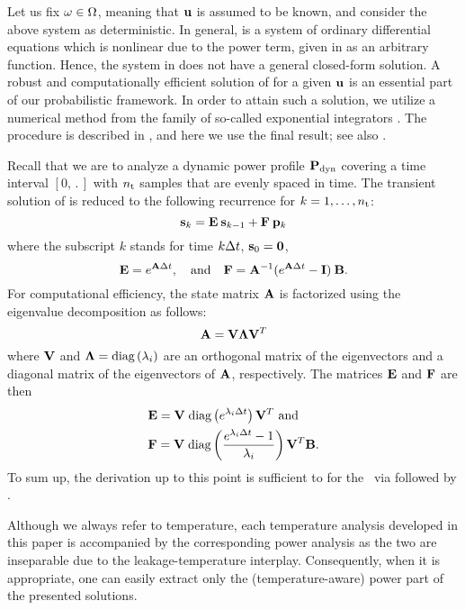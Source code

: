 Let us fix $\omega \in \Omega$, meaning that $\mathbf{u}$ is assumed to be known, and consider the above system as deterministic.
In general,  is a system of ordinary differential equations which is nonlinear due to the power term, given in  as an arbitrary function.
Hence, the system in  does not have a general closed-form solution.
A robust and computationally efficient solution of  for a given $\mathbf{u}$ is an essential part of our probabilistic framework.
In order to attain such a solution, we utilize a numerical method from the family of so-called exponential integrators \cite{hochbruck2010}.
The procedure is described in , and here we use the final result; see also \cite{ukhov2012}.

Recall that we are to analyze a dynamic power profile $\mathbf{P}_{\text{dyn}}$ covering a time interval $[0, \period]$ with ${n_\text{t}}$ samples that are evenly spaced in time.
The transient solution of  is reduced to the following recurrence for $k = 1, \dots, {n_\text{t}}$:
\begin{equation} \elab{recurrence}
  \vs_k = \mE \: \vs_{k - 1} + \mF \: \vp_k
\end{equation}
where the subscript $k$ stands for time $k \Delta t$, $\mathbf{s}_0 = \mathbf{0}$,
\[
  \mathbf{E} = e^{\mathbf{A} \Delta t}, \hspace{1em} \text{and} \hspace{1em} \mathbf{F} = \mathbf{A}^{-1} (e^{\mathbf{A} \Delta t} - \mathbf{I}) \: \mathbf{B}.
\]
For computational efficiency, the state matrix $\mathbf{A}$ is factorized using the eigenvalue decomposition as follows:
\begin{equation} \elab{eigenvalue-decomposition}
  \mA = \mV \mL \mV^T
\end{equation}
where $\mathbf{V}$ and $\mathbf{\Lambda} = \text{diag}\left( \lambda_i \right)$ are an orthogonal matrix of the eigenvectors and a diagonal matrix of the eigenvectors of $\mathbf{A}$, respectively.
The matrices $\mathbf{E}$ and $\mathbf{F}$ are then
\begin{align*}
  & \mathbf{E} = \mathbf{V} \; \text{diag}\left( e^{\lambda_i \Delta t} \right) \mathbf{V}^T \text{ and} \\
  & \mathbf{F} = \mathbf{V} \; \text{diag}\left(  \frac{e^{\lambda_i \Delta t} - 1}{\lambda_i}  \right) \mathbf{V}^T \mathbf{B}.
\end{align*}
To sum up, the derivation up to this point is sufficient to for the \tta\ via  followed by .
\begin{remark}
Although we always refer to temperature, each temperature analysis developed in this paper is accompanied by the corresponding power analysis as the two are inseparable due to the leakage-temperature interplay.
Consequently, when it is appropriate, one can easily extract only the (temperature-aware) power part of the presented solutions.
\end{remark}

